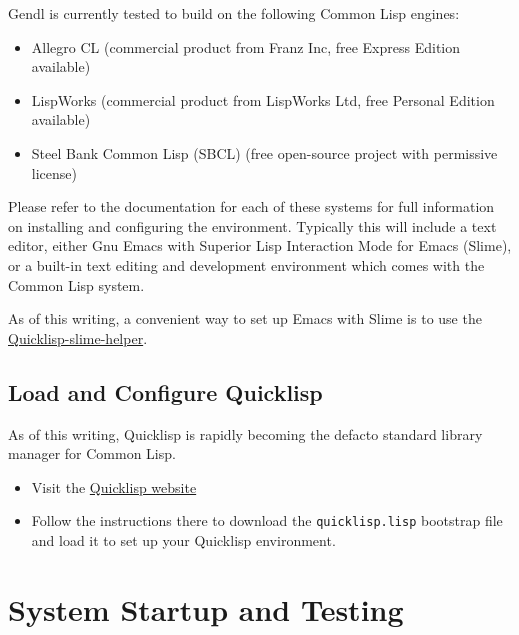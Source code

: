 \documentclass [11pt]{book}
\begin{document}
Gendl is currently tested to build on the following Common Lisp engines:

\begin{itemize}

\item Allegro CL (commercial product from Franz Inc, free Express Edition available)

\item LispWorks (commercial product from LispWorks Ltd, free Personal Edition available)

\item Steel Bank Common Lisp (SBCL) (free open-source project with permissive license)

\end{itemize}

Please refer to the documentation for each of these systems for full information on installing 
and configuring the environment. Typically this will include a text editor, either Gnu Emacs with Superior
Lisp Interaction Mode for Emacs (Slime), or a built-in text editing and development environment which 
comes with the Common Lisp system.

As of this writing, a convenient way to set up Emacs with Slime is to use the \href{http://github.com/quicklisp/quicklisp-slime-helper}{Quicklisp-slime-helper}.

\subsection{Load and Configure Quicklisp}

\label{subsec:loadandconfigurequicklisp}

As of this writing, Quicklisp is rapidly becoming the defacto standard library manager for Common Lisp.

\begin{itemize}

\item Visit the \href{http://quicklisp.org}{Quicklisp website}

\item Follow the instructions there to download the \texttt{quicklisp.lisp} bootstrap file and load it to set up your Quicklisp environment.

\end{itemize}



\section{System Startup and Testing}
\end{document}

